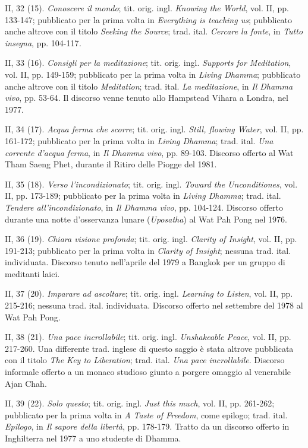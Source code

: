 II, 32 (15). \emph{Conoscere il mondo}; tit. orig. ingl. \emph{Knowing
the World}, vol. II, pp. 133-147; pubblicato per la prima volta in
\emph{Everything is teaching us}; pubblicato anche altrove con il titolo
\emph{Seeking the Source}; trad. ital. \emph{Cercare la fonte}, in
\emph{Tutto insegna}, pp. 104-117\emph{.}

II, 33 (16). \emph{Consigli per la meditazione}; tit. orig. ingl.
\emph{Supports for Meditation}, vol. II, pp. 149-159; pubblicato per la
prima volta in \emph{Living Dhamma}; pubblicato anche altrove con il
titolo \emph{Meditation}; trad. ital. \emph{La meditazione}, in \emph{Il
Dhamma vivo}, pp. 53-64. Il discorso venne tenuto allo Hampstead Vihara
a Londra, nel 1977.

II, 34 (17). \emph{Acqua ferma che scorre}; tit. orig. ingl.
\emph{Still, flowing Water}, vol. II, pp. 161-172; pubblicato per la
prima volta in \emph{Living Dhamma}; trad. ital. \emph{Una corrente
d'acqua ferma}, in \emph{Il Dhamma vivo}, pp. 89-103. Discorso offerto
al Wat Tham Saeng Phet, durante il Ritiro delle Piogge del 1981.

II, 35 (18). \emph{Verso l'incondizionato}; tit. orig. ingl.
\emph{Toward the Unconditiones}, vol. II, pp. 173-189; pubblicato per la
prima volta in \emph{Living Dhamma}; trad. ital. \emph{Tendere
all'incondizionato}, in \emph{Il Dhamma vivo}, pp. 104-124. Discorso
offerto durante una notte d'osservanza lunare (\emph{Uposatha}) al Wat
Pah Pong nel 1976.

II, 36 (19). \emph{Chiara visione profonda}; tit. orig. ingl.
\emph{Clarity of Insight}, vol. II, pp. 191-213; pubblicato per la prima
volta in \emph{Clarity of Insight}; nessuna trad. ital. individuata.
Discorso tenuto nell'aprile del 1979 a Bangkok per un gruppo di
meditanti laici.

II, 37 (20). \emph{Imparare ad ascoltare}; tit. orig. ingl.
\emph{Learning to Listen}, vol. II, pp. 215-216; nessuna trad. ital.
individuata. Discorso offerto nel settembre del 1978 al Wat Pah Pong.

II, 38 (21). \emph{Una pace incrollabile}; tit. orig. ingl.
\emph{Unshakeable Peace}, vol. II, pp. 217-260. Una differente trad.
inglese di questo saggio è stata altrove pubblicata con il titolo
\emph{The Key to Liberation}; trad. ital. \emph{Una pace incrollabile}.
Discorso informale offerto a un monaco studioso giunto a porgere omaggio
al venerabile Ajan Chah.

II, 39 (22). \emph{Solo questo}; tit. orig. ingl. \emph{Just this much},
vol. II, pp. 261-262; pubblicato per la prima volta in \emph{A Taste of
Freedom}, come epilogo; trad. ital. \emph{Epilogo}, in \emph{Il}
\emph{sapore della libertà}, pp. 178-179. Tratto da un discorso offerto
in Inghilterra nel 1977 a uno studente di Dhamma.

